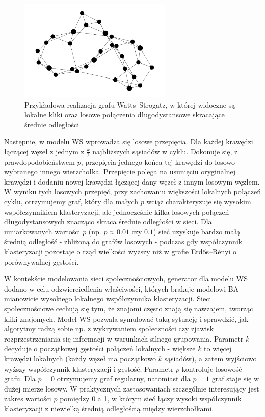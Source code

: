 \begin{figure}[h]
    \centering
    \includegraphics[width=0.65\textwidth]{assets/test_data/smallworld.png}
    \caption{Przykładowa realizacja grafu Watts--Strogatz, w której widoczne są lokalne kliki oraz losowe połączenia długodystansowe skracające średnie odległości}
    \label{fig:WS}
\end{figure}

Następnie, w modelu WS wprowadza się losowe przepięcia. Dla każdej krawędzi łączącej węzeł z jednym z $\frac{k}{2}$ najbliższych sąsiadów w cyklu. Dokonuje się, z prawdopodobieństwem $p$, przepięcia jednego końca tej krawędzi do losowo wybranego innego wierzchołka. Przepięcie polega na usunięciu oryginalnej krawędzi i dodaniu nowej krawędzi łączącej dany węzeł z innym losowym węzłem. W wyniku tych losowych przepięć, przy zachowaniu większości lokalnych połączeń cyklu, otrzymujemy graf, który dla małych $p$ wciąż charakteryzuje się wysokim współczynnikiem klasteryzacji, ale jednocześnie kilka losowych połączeń długodystansowych znacząco skraca średnie odległości w sieci. 
Dla umiarkowanych wartości $p$ (np. $p \approx 0.01$ czy $0.1$) sieć uzyskuje bardzo małą średnią odległość - zbliżoną do grafów losowych - podczas gdy współczynnik klasteryzacji pozostaje o rząd wielkości wyższy niż w grafie Erdős--Rényi o porównywalnej gęstości.

W kontekście modelowania sieci społecznościowych, generator dla modelu WS dodano w celu odzwierciedlenia właściwości, których brakuje modelowi BA - mianowicie wysokiego lokalnego współczynnika klasteryzacji. Sieci społecznościowe cechują się tym, że znajomi często znają się nawzajem, tworząc kliki znajomych. Model WS pozwala symulować taką sytuację i sprawdzić, jak algorytmy radzą sobie np. z wykrywaniem społeczności czy zjawisk rozprzestrzeniania się informacji w warunkach silnego grupowania. Parametr $k$ decyduje o początkowej gęstości połączeń lokalnych - większe $k$ to więcej krawędzi lokalnych (każdy węzeł ma początkowo $k$ sąsiadów), a zatem wyjściowo wyższy współczynnik klasteryzacji i gęstość. Parametr $p$ kontroluje losowość grafu. 
Dla $p=0$ otrzymujemy graf regularny, natomiast dla $p=1$ graf staje się w dużej mierze losowy. 
W praktycznych zastosowaniach szczególnie interesujący jest zakres wartości $p$ pomiędzy 0 a 1, w którym sieć łączy wysoki współczynnik klasteryzacji z niewielką średnią odległością między wierzchołkami.


